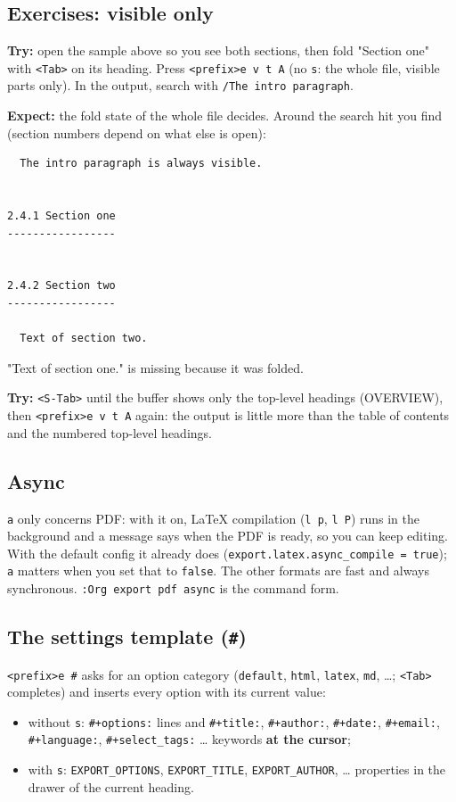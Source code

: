 \subsection{Exercises: visible only}
\label{sec:org3ec8003}
\textbf{Try:} open the sample above so you see both sections, then fold "Section
one" with \texttt{<Tab>} on its heading. Press \texttt{<prefix>e v t A} (no \texttt{s}: the
whole file, visible parts only). In the output, search with
\texttt{/The intro paragraph}.

\textbf{Expect:} the fold state of the whole file decides. Around the search hit
you find (section numbers depend on what else is open):

\begin{verbatim}
  The intro paragraph is always visible.


2.4.1 Section one
-----------------


2.4.2 Section two
-----------------

  Text of section two.
\end{verbatim}

"Text of section one." is missing because it was folded.

\textbf{Try:} \texttt{<S-Tab>} until the buffer shows only the top-level headings
(OVERVIEW), then \texttt{<prefix>e v t A} again: the output is little more than
the table of contents and the numbered top-level headings.
\subsection{Async}
\label{sec:org302e170}
\texttt{a} only concerns PDF: with it on, \LaTeX{} compilation (\texttt{l p}, \texttt{l P}) runs in
the background and a message says when the PDF is ready, so you can keep
editing. With the default config it already does
(\texttt{export.latex.async\_compile = true}); \texttt{a} matters when you set that to
\texttt{false}. The other formats are fast and always synchronous.
\texttt{:Org export pdf async} is the command form.
\subsection{The settings template (\texttt{\#})}
\label{sec:orgf7915eb}
\texttt{<prefix>e \#} asks for an option category (\texttt{default}, \texttt{html}, \texttt{latex},
\texttt{md}, \ldots{}; \texttt{<Tab>} completes) and inserts every option with its current
value:
\begin{itemize}
\item without \texttt{s}: \texttt{\#+options:} lines and \texttt{\#+title:}, \texttt{\#+author:}, \texttt{\#+date:},
\texttt{\#+email:}, \texttt{\#+language:}, \texttt{\#+select\_tags:} \ldots{} keywords \textbf{at the cursor};
\item with \texttt{s}: \texttt{EXPORT\_OPTIONS}, \texttt{EXPORT\_TITLE}, \texttt{EXPORT\_AUTHOR}, \ldots{} properties
in the drawer of the current heading.
\end{itemize}
